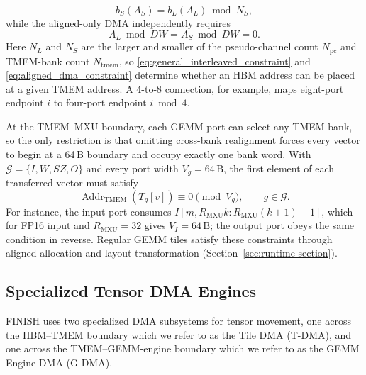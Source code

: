 \documentclass[sigconf,anonymous,nonacm]{acmart}
\newcommand{\ours}{\textsc{FINISH}}
\begin{document}
\begin{equation}
    b_S\left(A_S\right)
    =
    b_L\left(A_L\right)
    \bmod N_S ,
    \label{eq:general_interleaved_constraint}
\end{equation}
while the aligned-only DMA independently requires
\begin{equation}
    A_L \bmod DW
    =
    A_S \bmod DW
    =
    0 .
    \label{eq:aligned_dma_constraint}
\end{equation}
Here $N_L$ and $N_S$ are the larger and smaller of the pseudo-channel count $N_{\mathrm{pc}}$ and TMEM-bank count $N_{\mathrm{tmem}}$, so \eqref{eq:general_interleaved_constraint} and \eqref{eq:aligned_dma_constraint} determine whether an HBM address can be placed at a given TMEM address. A 4-to-8 connection, for example, maps eight-port endpoint $i$ to four-port endpoint $i \bmod 4$.

At the TMEM--MXU boundary, each GEMM port can select any TMEM bank, so the only restriction is that omitting cross-bank realignment forces every vector to begin at a 64\,B boundary and occupy exactly one bank word. With $\mathcal{G}=\{I,W,SZ,O\}$ and every port width $V_g=64\,\mathrm{B}$, the first element of each transferred vector must satisfy
\begin{equation}
    \operatorname{Addr}_{\mathrm{TMEM}}
    \left(T_g[v]\right)
    \equiv 0
    \pmod{V_g},
    \qquad g\in\mathcal{G}.
    \label{eq:tmem_gemm_vector_constraint}
\end{equation}
For instance, the input port consumes $I[m,R_{\mathrm{MXU}}k:R_{\mathrm{MXU}}(k+1)-1]$, which for FP16 input and $R_{\mathrm{MXU}}=32$ gives $V_I=64\,\mathrm{B}$; the output port obeys the same condition in reverse. Regular GEMM tiles satisfy these constraints through aligned allocation and layout transformation (Section~\ref{sec:runtime-section}).

\subsection{Specialized Tensor DMA Engines} 

\ours{} uses two specialized DMA subsystems for tensor movement, one across the HBM--TMEM boundary which we refer to as the Tile DMA (T-DMA), and one across the TMEM--GEMM-engine boundary which we refer to as the GEMM Engine DMA (G-DMA).
\end{document}

